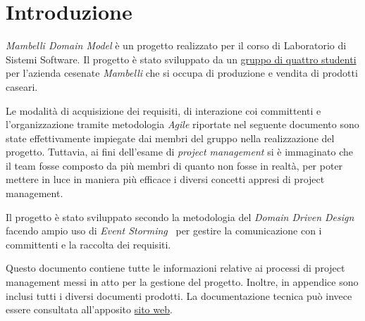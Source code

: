 \chapter*{Introduzione}

\emph{Mambelli Domain Model} è un progetto realizzato per il corso di Laboratorio di Sistemi Software.
Il progetto è stato sviluppato da un \href{https://atedeg.dev/about}{gruppo di quattro studenti} per l'azienda cesenate \emph{Mambelli} che si occupa di produzione e vendita di prodotti caseari.

Le modalità di acquisizione dei requisiti, di interazione coi committenti e l'organizzazione tramite metodologia \emph{Agile} riportate nel seguente documento sono state effettivamente impiegate dai membri del gruppo nella realizzazione del progetto. Tuttavia, ai fini dell'esame di \emph{project management} si è immaginato che il team fosse composto da più membri di quanto non fosse in realtà, per poter mettere in luce in maniera più efficace i diversi concetti appresi di project management.

Il progetto è stato sviluppato secondo la metodologia del \emph{Domain Driven Design}~\cite{cit:ddd} facendo ampio uso di \emph{Event Storming}~\cite{cit:event-storming} per gestire la comunicazione con i committenti e la raccolta dei requisiti.

Questo documento contiene tutte le informazioni relative ai processi di project management messi in atto per la gestione del progetto. Inoltre, in appendice sono inclusi tutti i diversi documenti prodotti.
La documentazione tecnica può invece essere consultata all'apposito \href{https://atedeg.dev/mdm/_docs/introduction.html}{sito web}.
